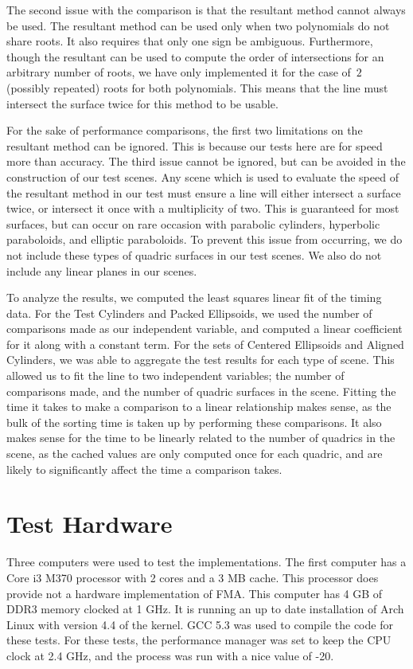 \documentclass{cccg16}
\begin{document}
The second issue with the comparison is that the resultant method
cannot always be used.  The resultant method can be used only when two
polynomials do not share roots.  It also requires that only one sign
be ambiguous.  Furthermore, though the resultant can be used to
compute the order of intersections for an arbitrary number of roots,
we have only implemented it for the case of~$2$ (possibly repeated)
roots for both polynomials.  This means that the line must intersect
the surface twice for this method to be usable.

For the sake of performance comparisons, the first two limitations on
the resultant method can be ignored.  This is because our tests here
are for speed more than accuracy.  The third issue cannot be ignored,
but can be avoided in the construction of our test scenes.  Any scene
which is used to evaluate the speed of the resultant method in our
test must ensure a line will either intersect a surface twice, or
intersect it once with a multiplicity of two.  This is guaranteed for
most surfaces, but can occur on rare occasion with parabolic
cylinders, hyperbolic paraboloids, and elliptic paraboloids.  To
prevent this issue from occurring, we do not include these types of
quadric surfaces in our test scenes.  We also do not include any
linear planes in our scenes.

To analyze the results, we computed the least squares linear fit of
the timing data.  For the Test Cylinders and Packed Ellipsoids, we
used the number of comparisons made as our independent variable, and
computed a linear coefficient for it along with a constant term.  For
the sets of Centered Ellipsoids and Aligned Cylinders, we was able to
aggregate the test results for each type of scene.  This allowed us to
fit the line to two independent variables; the number of comparisons
made, and the number of quadric surfaces in the scene.  Fitting the
time it takes to make a comparison to a linear relationship makes
sense, as the bulk of the sorting time is taken up by performing these
comparisons.  It also makes sense for the time to be linearly related
to the number of quadrics in the scene, as the cached values are only
computed once for each quadric, and are likely to significantly affect
the time a comparison takes.

\section{Test Hardware}
Three computers were used to test the implementations.  The first
computer has a Core i3 M370 processor with 2 cores and a 3 MB cache.
This processor does provide not a hardware implementation of FMA.
This computer has 4 GB of DDR3 memory clocked at 1 GHz.  It is running
an up to date installation of Arch Linux with version 4.4 of the
kernel.  GCC 5.3 was used to compile the code for these tests.  For
these tests, the performance manager was set to keep the CPU clock at
2.4 GHz, and the process was run with a nice value of -20.
\end{document}
